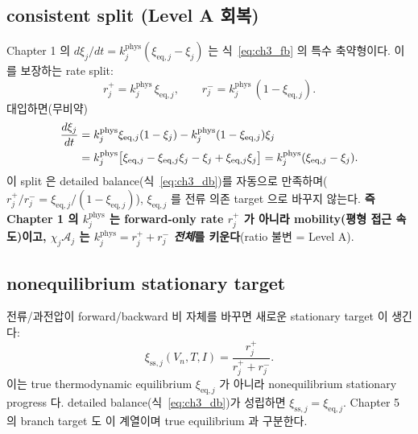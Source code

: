 \documentclass[11pt,a4paper]{article}
\newcommand{\eq}{\mathrm{eq}}
\newcommand{\sstat}{\mathrm{ss}}
\begin{document}
\subsection{consistent split (Level A 회복)}
Chapter 1 의 $d\xi_j/dt=k_j^{\mathrm{phys}}(\xi_{\eq,j}-\xi_j)$ 는 식~\eqref{eq:ch3_fb} 의 특수 축약형이다.
이를 보장하는 rate split:
\begin{equation}
r_j^+=k_j^{\mathrm{phys}}\,\xi_{\eq,j},\qquad r_j^-=k_j^{\mathrm{phys}}\,(1-\xi_{\eq,j}).
\label{eq:ch3_split}
\end{equation}
대입하면(무비약)
\begin{align}
\frac{d\xi_j}{dt}
&=k_j^{\mathrm{phys}}\xi_{\eq,j}(1-\xi_j)-k_j^{\mathrm{phys}}(1-\xi_{\eq,j})\xi_j \notag\\
&=k_j^{\mathrm{phys}}\big[\xi_{\eq,j}-\xi_{\eq,j}\xi_j-\xi_j+\xi_{\eq,j}\xi_j\big]
=k_j^{\mathrm{phys}}(\xi_{\eq,j}-\xi_j).
\label{eq:ch3_recover}
\end{align}
이 split 은 detailed balance(식~\eqref{eq:ch3_db})를 자동으로 만족하며($r_j^+/r_j^-=\xi_{\eq,j}/(1-\xi_{\eq,j})$),
$\xi_{\eq,j}$ 를 전류 의존 target 으로 바꾸지 않는다. \textbf{즉 Chapter 1 의 $k_j^{\mathrm{phys}}$ 는 forward-only
rate $r_j^+$ 가 아니라 mobility(평형 접근 속도)이고, $\chi_j\mathcal A_j$ 는 $k_j^{\mathrm{phys}}=r_j^++r_j^-$
\emph{전체}를 키운다}(ratio 불변 = Level A).

\subsection{nonequilibrium stationary target}
전류/과전압이 forward/backward 비 자체를 바꾸면 새로운 stationary target 이 생긴다:
\begin{equation}
\xi_{\sstat,j}(V_n,T,I)=\frac{r_j^+}{r_j^++r_j^-}.
\label{eq:ch3_xiss}
\end{equation}
이는 true thermodynamic equilibrium $\xi_{\eq,j}$ 가 아니라 nonequilibrium stationary progress 다.
detailed balance(식~\eqref{eq:ch3_db})가 성립하면 $\xi_{\sstat,j}=\xi_{\eq,j}$. Chapter 5 의 branch target 도
이 계열이며 true equilibrium 과 구분한다.

\end{document}
